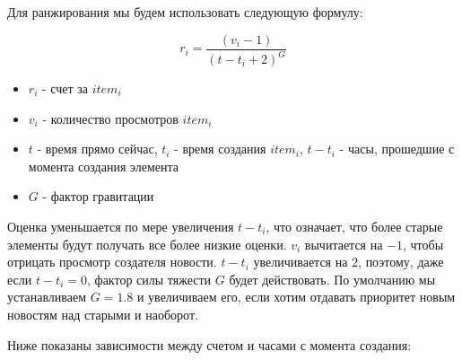 \documentclass[14pt]{matmex-diploma-custom}
\begin{document}
Для ранжирования мы будем использовать следующую формулу:

\begin {equation}
    r_i = \frac {(v_i - 1)} {(t - t_i + 2) ^ G}
\end {equation}

\begin {itemize}
    \item $ r_i $ - счет за $ item_i $
    \item $ v_i $ - количество просмотров $ item_i $
    \item $ t $ - время прямо сейчас, $ t_i $ - время создания $ item_i $, $ t - t_i $ - часы, прошедшие с момента создания элемента
    \item $ G $ - фактор гравитации
\end {itemize}

Оценка уменьшается по мере увеличения $ t - t_i $, что означает, что более старые элементы будут получать все более низкие оценки. $ v_i $ вычитается на $ -1 $, чтобы отрицать просмотр создателя новости. $ t - t_i $ увеличивается на $ 2 $, поэтому, даже если $ t - t_i = 0$, фактор силы тяжести $ G $ будет действовать. По умолчанию мы устанавливаем $ G = 1.8 $ и увеличиваем его, если хотим отдавать приоритет новым новостям над старыми и наоборот.


Ниже показаны зависимости между счетом и часами с момента создания:
\end{document}
